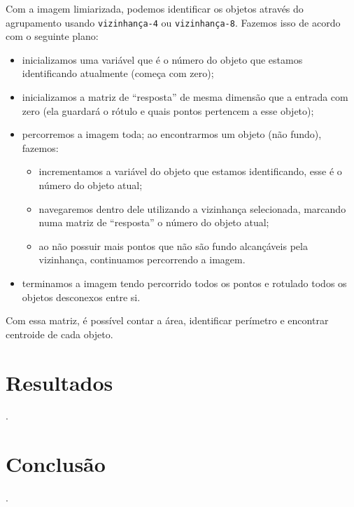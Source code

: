 \documentclass[brazilian,a4paper,twocolumn]{article}
\begin{document}
        Com a imagem limiarizada, podemos identificar os objetos através do agrupamento usando \texttt{vizinhança-4} ou \texttt{vizinhança-8}. Fazemos isso de acordo com o seguinte plano:
        \begin{itemize}
            \item inicializamos uma variável que é o número do objeto que estamos identificando atualmente (começa com zero);
            \item inicializamos a matriz de ``resposta'' de mesma dimensão que a entrada com zero (ela guardará o rótulo e quais pontos pertencem a esse objeto);
            \item percorremos a imagem toda; ao encontrarmos um objeto (não fundo), fazemos:
            \begin{itemize}
                \item incrementamos a variável do objeto que estamos identificando, esse é o número do objeto atual;
                \item navegaremos dentro dele utilizando a vizinhança selecionada, marcando numa matriz de ``resposta'' o número do objeto atual;
                \item ao não possuir mais pontos que não são fundo alcançáveis pela vizinhança, continuamos percorrendo a imagem.
            \end{itemize}
            \item terminamos a imagem tendo percorrido todos os pontos e rotulado todos os objetos desconexos entre si.
        \end{itemize}

        Com essa matriz, é possível contar a área, identificar perímetro e encontrar centroide de cada objeto.

\section{Resultados}

    .


\section{Conclusão}

    .
\end{document}
